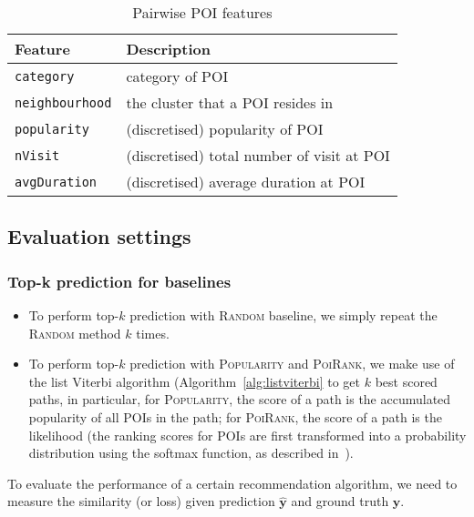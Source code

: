 \begin{table}[!h]
\caption{Pairwise POI features}
\label{tab:tranfeature}
\centering
\small
\setlength{\tabcolsep}{2pt} %
\begin{tabular}{l|l} \hline
\textbf{Feature}       & \textbf{Description} \\ \hline
\texttt{category}      & category of POI \\
\texttt{neighbourhood} & the cluster that a POI resides in \\
\texttt{popularity}    & (discretised) popularity of POI \\
\texttt{nVisit}        & (discretised) total number of visit at POI \\
\texttt{avgDuration}  & (discretised) average duration at POI \\ \hline
\end{tabular}
\end{table}


\clearpage
\subsection{Evaluation settings}
\label{sec:metric}

\subsubsection{Top-k prediction for baselines}
\begin{itemize}
\item To perform top-$k$ prediction with \textsc{Random} baseline, we simply repeat the \textsc{Random} method $k$ times.
\item To perform top-$k$ prediction with \textsc{Popularity} and \textsc{PoiRank}, we make use of the list Viterbi algorithm 
      (Algorithm~\ref{alg:listviterbi} to get $k$ best scored paths, in particular, 
      for \textsc{Popularity}, the score of a path is the accumulated popularity of all POIs in the path; 
      for \textsc{PoiRank}, the score of a path is the likelihood 
      (the ranking scores for POIs are first transformed into a probability distribution using the softmax function, as described in~\cite{cikm16paper}).
\end{itemize}

To evaluate the performance of a certain recommendation algorithm,
we need to measure the similarity (or loss) given prediction $\hat{\mathbf{y}}$
and ground truth $\mathbf{y}$.


